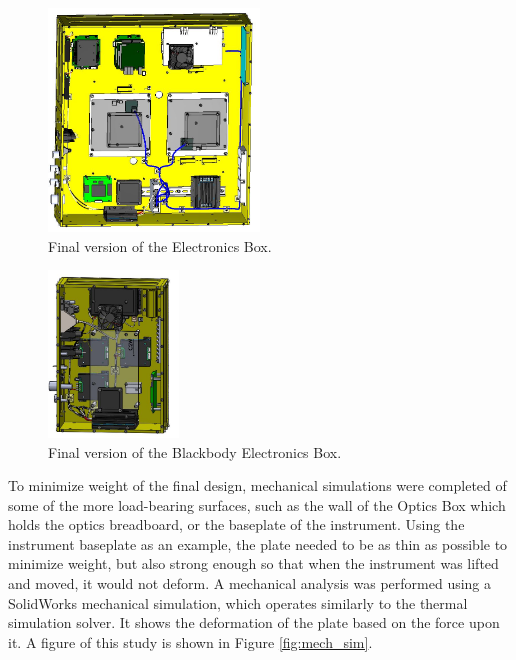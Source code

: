 \begin{figure}
    \centering
    \includegraphics[width=0.5\textwidth]{chap3_images/LIFE_V5_final_images/EBOX_V3_final.JPG}
    \caption{Final version of the Electronics Box.}
    \label{fig:EBOX_FINAL}
\end{figure}

\begin{figure}
    \centering
    \includegraphics[width=0.31\textwidth]{chap3_images/LIFE_V5_final_images/BBEbox_final.JPG}
    \caption{Final version of the Blackbody Electronics Box.}
    \label{fig:BBEBOX_FINAL}
\end{figure}

To minimize weight of the final design, mechanical simulations were completed of some of the more load-bearing surfaces, such as the wall of the Optics Box which holds the optics breadboard, or the baseplate of the instrument. Using the instrument baseplate as an example, the plate needed to be as thin as possible to minimize weight, but also strong enough so that when the instrument was lifted and moved, it would not deform. A mechanical analysis was performed using a SolidWorks mechanical simulation, which operates similarly to the thermal simulation solver. It shows the deformation of the plate based on the force upon it. A figure of this study is shown in Figure \ref{fig:mech_sim}.

